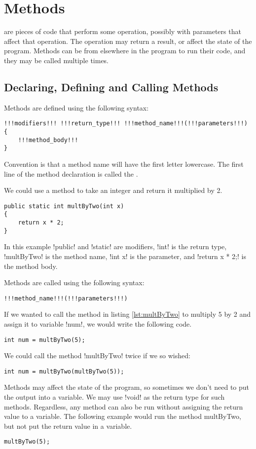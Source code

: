 \documentclass[11pt]{report}
\begin{document}
\section{Methods}
\label{sec:methods}
 are pieces of code that perform some operation, possibly with parameters that affect that operation. The operation may return a result, or affect the state of the program. Methods can be  from elsewhere in the program to run their code, and they may be called multiple times.
\subsection{Declaring, Defining and Calling Methods}
Methods are defined using the following syntax:
\vspace{-15pt}
\begin{lstlisting}[style=javaSyntax]
!!!modifiers!!! !!!return_type!!! !!!method_name!!!(!!!parameters!!!) 
{
    !!!method_body!!!
}
\end{lstlisting}
Convention is that a method name will have the first letter lowercase. The first line of the method declaration is called the .
\begin{eg} We could use a method to take an integer and return it multiplied by 2.
\begin{lstlisting}[caption=An example method, label=lst:multByTwo]
public static int multByTwo(int x)
{
    return x * 2;
}
\end{lstlisting}
In this example \inlineJava!public! and \inlineJava!static! are modifiers, \inlineJava!int! is the return type, \inlineJava!multByTwo! is the method name, \inlineJava!int x! is the parameter, and \inlineJava!return x * 2;! is the method body.
\end{eg}
\noindent Methods are called using the following syntax:
\vspace{-15pt}
\begin{lstlisting}[style=javaSyntax]
!!!method_name!!!(!!!parameters!!!) 
\end{lstlisting}
\begin{eg} If we wanted to call the method in listing \ref{lst:multByTwo} to multiply 5 by 2 and assign it to variable \inlineJava!num!, we would write the following code.
\vspace{-15pt}
\begin{lstlisting}
int num = multByTwo(5);
\end{lstlisting}
We could call the method \inlineJava!multByTwo! twice if we so wished:
\vspace{-15pt}
\begin{lstlisting}
int num = multByTwo(multByTwo(5));
\end{lstlisting}
Methods may affect the state of the program, so sometimes we don't need to put the output into a variable. We may use \inlineJava!void! as the return type for such methods. Regardless, any method can also be run without assigning the return value to a variable. The following example would run the method multByTwo, but not put the return value in a variable.
\vspace{-15pt}
\begin{lstlisting}
multByTwo(5);
\end{lstlisting}
\end{eg}
\end{document}
